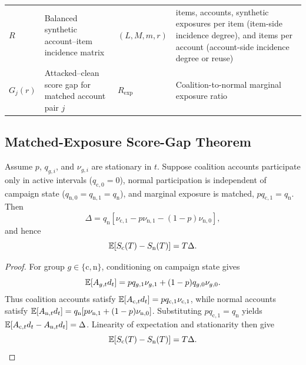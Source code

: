 \begin{table}[t]
\begin{tabularx}{\textwidth}{@{}lXlX@{}}
$R$
& Balanced synthetic account--item incidence matrix
&
$(L,M,m,r)$&
items, accounts, synthetic exposures per item
(item-side incidence degree), and items per account
(account-side incidence degree or reuse)
\\

$G_j(r)$
& Attacked--clean score gap for matched account pair $j$
&
$R_{\mathrm{exp}}$
& Coalition-to-normal marginal exposure ratio
\\

\bottomrule
\end{tabularx}
\end{table}



\subsection{Matched-Exposure Score-Gap Theorem}
\label{sec:supp-score-gap}

\begin{theorem}
\label{thm:supp-divergence}
Assume $p$, $q_{g,i}$, and $\nu_{g,i}$ are stationary in $t$.
Suppose coalition accounts participate only in active intervals
($q_{\mathrm c,0}=0$), normal participation is independent of campaign state
($q_{\mathrm n,0}=q_{\mathrm n,1}=q_{\mathrm n}$), and marginal exposure is
matched, $p q_{\mathrm c,1}=q_{\mathrm n}$. Then
\begin{equation}
\label{eq:supp-expected-gap}
\Delta
=
q_{\mathrm n}
\left[
\nu_{\mathrm c,1}
-
p\nu_{\mathrm n,1}
-
(1-p)\nu_{\mathrm n,0}
\right],
\end{equation}
and hence
\[
\mathbb{E}[S_{\mathrm c}(T)-S_{\mathrm n}(T)]
=
T\Delta.
\]
\end{theorem}

\begin{proof}
For group $g\in\{\mathrm c,\mathrm n\}$, conditioning on campaign state gives
\begin{equation}
\label{eq:supp-group-increment}
\mathbb{E}[A_{g,t}d_t]
=
p q_{g,1}\nu_{g,1}
+
(1-p)q_{g,0}\nu_{g,0}.
\end{equation}
Thus coalition accounts satisfy
$\mathbb{E}[A_{\mathrm c,t}d_t]=p q_{\mathrm c,1}\nu_{\mathrm c,1}$, while normal
accounts satisfy
$\mathbb{E}[A_{\mathrm n,t}d_t]
=
q_{\mathrm n}[p\nu_{\mathrm n,1}+(1-p)\nu_{\mathrm n,0}]$.
Substituting $p q_{\mathrm c,1}=q_{\mathrm n}$ yields
$\mathbb{E}[A_{\mathrm c,t}d_t-A_{\mathrm n,t}d_t]=\Delta$.
Linearity of expectation and stationarity then give
\[
\mathbb{E}[S_{\mathrm c}(T)-S_{\mathrm n}(T)]
=
T\Delta.
\]
\end{proof}

